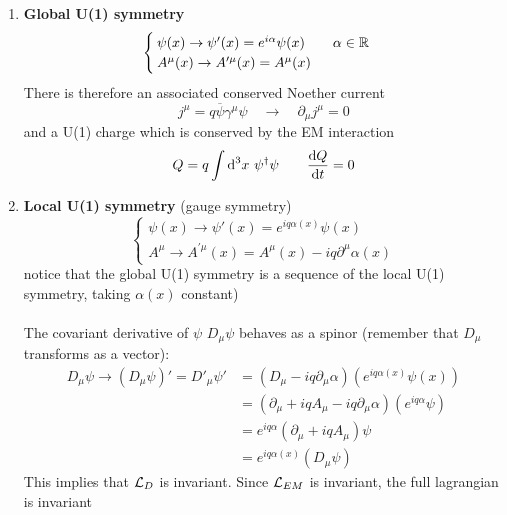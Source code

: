 \documentclass[TheoreticalPhy_ModB.tex]{subfiles}
\begin{document}
\begin{enumerate}[label=$\bullet$]
\item \textbf{Global U(1) symmetry}
\[
\begin{cases}
\psi(x) \to \psi'(x) = e^{i \alpha}\psi(x) \qquad \alpha \in \mathbb{R} \\
A^{\mu}(x) \to A^{\prime \mu}(x) = A^{\mu}(x)
\end{cases}
\]
There is therefore an associated conserved Noether current
\[
j^{\mu} = q \overline{\psi} \gamma^{\mu} \psi
\quad \to \quad
\partial_{\mu}j^{\mu} = 0 
\]
and a U(1) charge which is conserved by the EM interaction
\[
Q = q \int \textup{d}^3 x \ \psi^{\dagger} \psi
\qquad
\frac{\textup{d} Q}{\textup{d} t} = 0
\]
\item \textbf{Local U(1) symmetry} (gauge symmetry)
\[
\begin{cases}
\psi(x) \to \psi'(x) = e^{iq\alpha(x)} \psi(x) \\
A^{\mu} \to A^{\prime \mu}(x) = A^{\mu}(x) - iq\partial^{\mu}\alpha(x)
\end{cases}
\]
notice that the global U(1) symmetry is a sequence of the local U(1) symmetry, taking $\alpha(x)$ constant)\\ \\
The covariant derivative of $\psi$ $D_{\mu}\psi$ behaves as a spinor (remember that $D_{\mu}$ transforms as a vector):
\[
\begin{split}
D_{\mu}\psi \to (D_{\mu}\psi)' = D'_{\mu}\psi'	& = (D_{\mu} - iq\partial_{\mu} \alpha)(e^{iq\alpha(x)} \psi(x)) \\
	& = (\partial_{\mu} + iqA_{\mu} - iq\partial_{\mu}\alpha)(e^{iq\alpha} \psi) \\
	& = e^{iq\alpha}(\partial_{\mu} + iqA_{\mu})\psi \\
	& = e^{iq\alpha(x)}(D_{\mu}\psi)
\end{split}
\]
This implies that $\mathcal{L}_D$ is invariant. Since $\mathcal{L}_{EM}$ is invariant, the full lagrangian is invariant
\end{enumerate}
\end{document}

